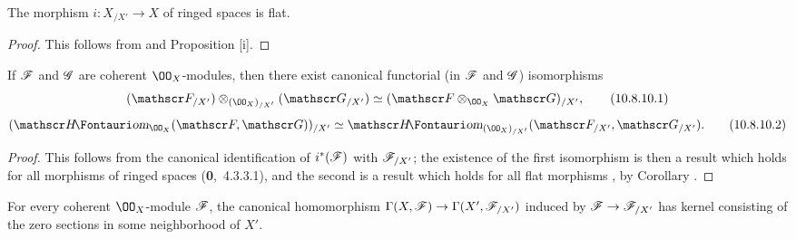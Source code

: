 \begin{cor}[10.8.9]
\label{1.10.8.9}
The morphism $i:X_{/X'}\to X$ of ringed spaces is flat.
\end{cor}

\begin{proof}
\label{proof-1.10.8.9}
This follows from  and Proposition [i].
\end{proof}

\begin{cor}[10.8.10]
\label{1.10.8.10}
If $\mathscr{F}$ and $\mathscr{G}$ are coherent $\OO_X$-modules, then there exist canonical functorial (in $\mathscr{F}$ and $\mathscr{G}$) isomorphisms
\begin{equation*}
\label{1.10.8.10.1}
  (\sh{F}_{/X'})\otimes_{(\OO_X)_{/X'}}(\sh{G}_{/X'})\isoto(\sh{F}\otimes_{\OO_X}\sh{G})_{/X'},
  \tag{10.8.10.1}
\end{equation*}
\begin{equation*}
\label{1.10.8.10.2}
  (\shHom_{\OO_X}(\sh{F},\sh{G}))_{/X'}\isoto\shHom_{(\OO_X)_{/X'}}(\sh{F}_{/X'},\sh{G}_{/X'}).
  \tag{10.8.10.2}
\end{equation*}
\end{cor}

\begin{proof}
\label{proof-1.10.8.10}
This follows from the canonical identification of $i^*(\mathscr{F})$ with $\mathscr{F}_{/X'}$; the existence of the first isomorphism is then a result which holds for all morphisms of ringed spaces (\textbf{0},~4.3.3.1), and the second is a result which holds for all flat morphisms , by Corollary .
\end{proof}

\begin{prop}[10.8.11]
\label{1.10.8.11}
For every coherent $\OO_X$-module $\mathscr{F}$, the canonical homomorphism $\Gamma(X,\sh{F})\to\Gamma(X',\sh{F}_{/X'})$ induced by $\sh{F}\to\sh{F}_{/X'}$ has kernel consisting of the zero sections in some neighborhood of $X'$.
\end{prop}

